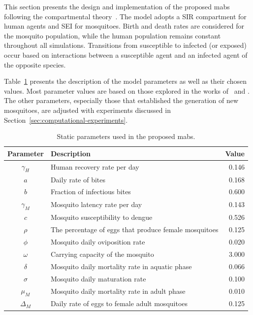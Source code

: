 This section presents the design and implementation of the proposed \gls{mabs}
following the compartmental theory~\citep{amaku:2014}. The model adopts a SIR
compartment for human agents and SEI for mosquitoes. Birth and death rates are
considered for the mosquito population, while the human population remains
constant throughout all simulations. Transitions from susceptible to infected
(or exposed) occur based on interactions between a susceptible agent and an
infected agent of the opposite species.

Table~\ref{tab:parameters-mabs} presents the description of the model parameters
as well as their chosen values. Most parameter values are based on those
explored in the works of~\cite{da-silva:2020} and \cite{dwivedi:2022}. The other
parameters, especially those that established the generation of new mosquitoes,
are adjusted with experiments discussed in
Section~\ref{sec:computational-experiments}.

\begin{table}[!ht]
	\centering
	\caption{\label{tab:parameters-mabs} Static parameters used in the proposed
		\gls{mabs}.} \small{%
		\begin{tabular}{clr}
			\toprule
			\textbf{Parameter} & \textbf{Description}                                  & \textbf{Value} \\ \midrule
			$\gamma_H$         & Human recovery rate per day                           & 0.146          \\ \hline
			$a$                & Daily rate of bites                                   & 0.168          \\ \hline
			$b$                & Fraction of infectious bites                          & 0.600          \\ \hline
			$\gamma_M$         & Mosquito latency rate per day                         & 0.143          \\ \hline
			$c$                & Mosquito susceptibility to dengue                     & 0.526          \\ \hline
			$\rho$             & The percentage of eggs that produce female mosquitoes & 0.125
			\\ \hline
			$\phi$             & Mosquito daily oviposition rate                       & 0.020          \\ \hline
			$\omega$           & Carrying capacity of the mosquito                     & 3.000          \\
			\hline
			$\delta$           & Mosquito daily mortality rate in aquatic phase        & 0.066          \\ \hline
			$\sigma$           & Mosquito daily maturation rate                        & 0.100          \\ \hline
			$\mu_M$            & Mosquito daily mortality rate in adult phase          & 0.010
			\\ \hline
			$\Delta_M$         & Daily rate of eggs to female adult mosquitoes         &
			0.125                                                                                       \\
			\bottomrule
		\end{tabular}%
	}
\end{table}

